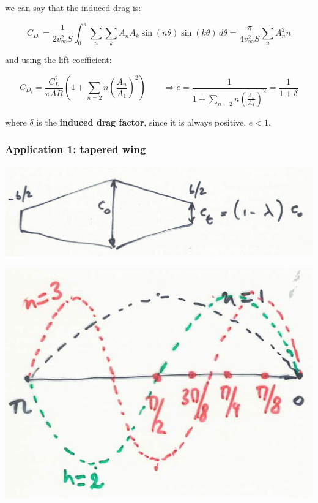 	we can say that the induced drag is:
	
	\begin{equation}
	C_{D_i} = \frac{1}{2v_\infty ^2 S} \int _0 ^\pi \sum _n \sum _k A_n A_k \sin (n\theta) \sin (k\theta) \, d\theta = \frac{\pi}{4v_\infty ^2 S} \sum _n A_n ^2 n
	\end{equation}
	
	and using the lift coefficient:
	
	\begin{equation}
	C_{D_i} = \frac{C_L^2}{\pi AR}  \left(1+\sum _{n=2} n \left(\frac{A_n}{A_1}\right)^2 \right) \qquad \Rightarrow e = \frac{1}{1+\sum _{n=2} n \left(\frac{A_n}{A_1}\right)^2} = \frac{1}{1+\delta}
	\end{equation}
	
	where $\delta $ is the \textbf{induced drag factor}, since it is always positive, $e<1$. 
	
\subsubsection{Application 1: tapered wing}
	
	\begin{center}
	\begin{minipage}{0.4\textwidth}
	\includegraphics[scale=0.25]{ch3/21}
	\label{fig:3.21}
	\end{minipage}
	\begin{minipage}{0.22\textwidth}
	\includegraphics[scale=0.22]{ch3/22}
	\label{fig:3.22}
	\end{minipage}
	\end{center}

